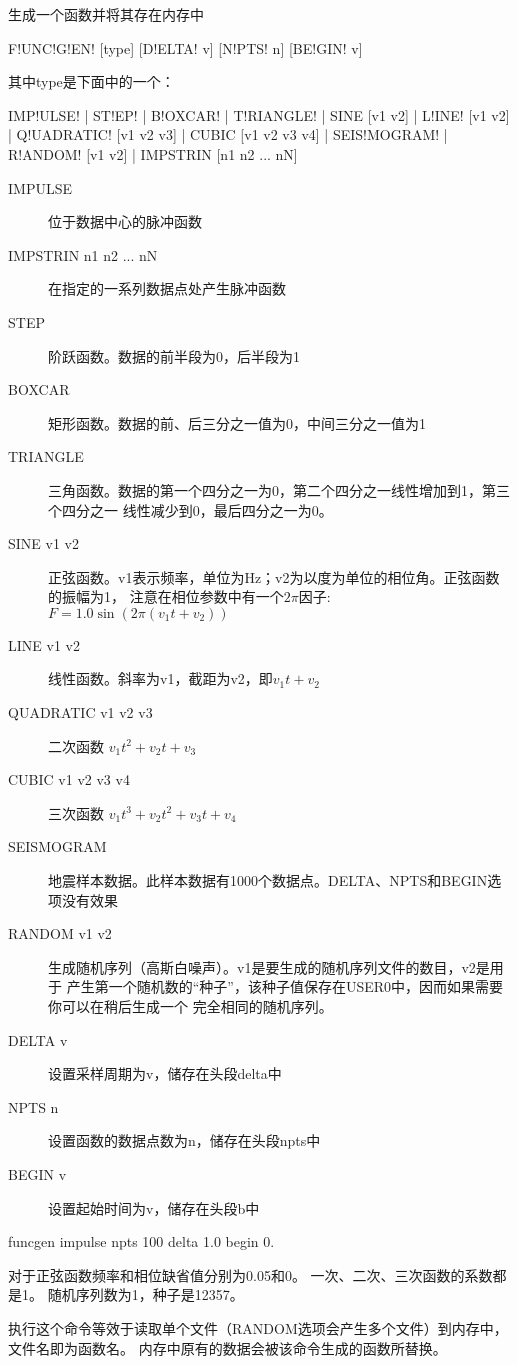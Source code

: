 \label{cmd:funcgen}

生成一个函数并将其存在内存中

\begin{SACSTX}
F!UNC!G!EN! [type] [D!ELTA! v] [N!PTS! n] [BE!GIN! v]
\end{SACSTX}
其中type是下面中的一个：
\begin{SACSTX}
IMP!ULSE! | ST!EP! | B!OXCAR! | T!RIANGLE! | SINE [v1 v2] | L!INE! [v1 v2] |
Q!UADRATIC! [v1 v2 v3] | CUBIC [v1 v2 v3 v4] | SEIS!MOGRAM! |
R!ANDOM! [v1 v2] | IMPSTRIN  [n1 n2 ... nN]
\end{SACSTX}

\begin{description}
\item [IMPULSE] 位于数据中心的脉冲函数
\item [IMPSTRIN n1 n2 ... nN] 在指定的一系列数据点处产生脉冲函数
\item [STEP] 阶跃函数。数据的前半段为0，后半段为1
\item [BOXCAR] 矩形函数。数据的前、后三分之一值为0，中间三分之一值为1
\item [TRIANGLE] 三角函数。数据的第一个四分之一为0，第二个四分之一线性增加到1，第三个四分之一
    线性减少到0，最后四分之一为0。
\item [SINE v1 v2] 正弦函数。v1表示频率，单位为Hz；v2为以度为单位的相位角。正弦函数的振幅为1，
    注意在相位参数中有一个$2\pi$因子: $ F = 1.0 \sin (2\pi (v_1t+v_2))$
\item [LINE v1 v2] 线性函数。斜率为v1，截距为v2，即$ v_1 t + v_2 $
\item [QUADRATIC v1 v2 v3] 二次函数 $v_1 t^{2} + v_2 t + v_3 $
\item [CUBIC v1 v2 v3 v4] 三次函数 $ v_1 t^{3} + v_2 t^2 + v_3t + v_4 $
\item [SEISMOGRAM] 地震样本数据。此样本数据有1000个数据点。DELTA、NPTS和BEGIN选项没有效果
\item [RANDOM v1 v2] 生成随机序列（高斯白噪声）。v1是要生成的随机序列文件的数目，v2是用于
    产生第一个随机数的``种子''，该种子值保存在USER0中，因而如果需要你可以在稍后生成一个
    完全相同的随机序列。
\item [DELTA v] 设置采样周期为v，储存在头段delta中
\item [NPTS n] 设置函数的数据点数为n，储存在头段npts中
\item [BEGIN v] 设置起始时间为v，储存在头段b中
\end{description}

\begin{SACDFT}
funcgen impulse npts 100 delta 1.0 begin 0.
\end{SACDFT}
对于正弦函数频率和相位缺省值分别为0.05和0。
一次、二次、三次函数的系数都是1。
随机序列数为1，种子是12357。

执行这个命令等效于读取单个文件（RANDOM选项会产生多个文件）到内存中，文件名即为函数名。
内存中原有的数据会被该命令生成的函数所替换。

